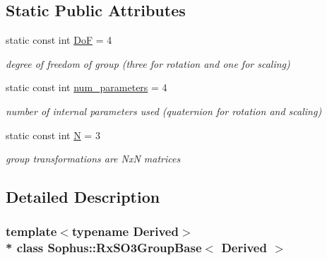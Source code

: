\subsection*{Static Public Attributes}
\begin{DoxyCompactItemize}
\item 
static const int \hyperlink{class_sophus_1_1_rx_s_o3_group_base_a04536baf7b3670c95ccaef37d7105ba1}{DoF} = 4\hypertarget{class_sophus_1_1_rx_s_o3_group_base_a04536baf7b3670c95ccaef37d7105ba1}{}\label{class_sophus_1_1_rx_s_o3_group_base_a04536baf7b3670c95ccaef37d7105ba1}

\begin{DoxyCompactList}\small\item\em degree of freedom of group (three for rotation and one for scaling) \end{DoxyCompactList}\item 
static const int \hyperlink{class_sophus_1_1_rx_s_o3_group_base_a19a6866f0ec97d0abcc3fda1de37215d}{num\+\_\+parameters} = 4\hypertarget{class_sophus_1_1_rx_s_o3_group_base_a19a6866f0ec97d0abcc3fda1de37215d}{}\label{class_sophus_1_1_rx_s_o3_group_base_a19a6866f0ec97d0abcc3fda1de37215d}

\begin{DoxyCompactList}\small\item\em number of internal parameters used (quaternion for rotation and scaling) \end{DoxyCompactList}\item 
static const int \hyperlink{class_sophus_1_1_rx_s_o3_group_base_ab35c867a7781b1993f12ac6cb2fdf80b}{N} = 3\hypertarget{class_sophus_1_1_rx_s_o3_group_base_ab35c867a7781b1993f12ac6cb2fdf80b}{}\label{class_sophus_1_1_rx_s_o3_group_base_ab35c867a7781b1993f12ac6cb2fdf80b}

\begin{DoxyCompactList}\small\item\em group transformations are NxN matrices \end{DoxyCompactList}\end{DoxyCompactItemize}


\subsection{Detailed Description}
\subsubsection*{template$<$typename Derived$>$\\*
class Sophus\+::\+Rx\+S\+O3\+Group\+Base$<$ Derived $>$}

